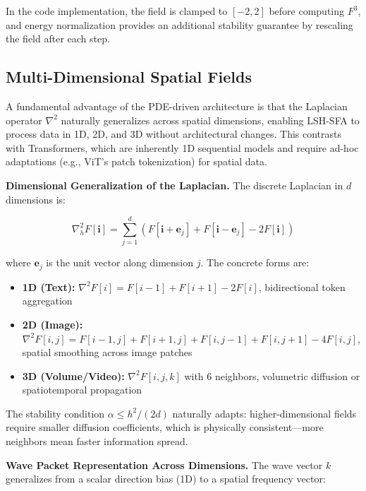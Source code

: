 \documentclass{article}
\begin{document}
In the code implementation, the field is clamped to $[-2, 2]$ before computing $F^3$, and energy normalization provides an additional stability guarantee by rescaling the field after each step.

\subsection{Multi-Dimensional Spatial Fields}

A fundamental advantage of the PDE-driven architecture is that the Laplacian operator $\nabla^2$ naturally generalizes across spatial dimensions, enabling LSH-SFA to process data in 1D, 2D, and 3D without architectural changes. This contrasts with Transformers, which are inherently 1D sequential models and require ad-hoc adaptations (e.g., ViT's patch tokenization) for spatial data.

\textbf{Dimensional Generalization of the Laplacian.} The discrete Laplacian in $d$ dimensions is:

\begin{equation}
\nabla^2_h F[\mathbf{i}] = \sum_{j=1}^{d} \left(F[\mathbf{i} + \mathbf{e}_j] + F[\mathbf{i} - \mathbf{e}_j] - 2F[\mathbf{i}]\right)
\end{equation}

where $\mathbf{e}_j$ is the unit vector along dimension $j$. The concrete forms are:

\begin{itemize}
\item \textbf{1D (Text):} $\nabla^2 F[i] = F[i-1] + F[i+1] - 2F[i]$, bidirectional token aggregation
\item \textbf{2D (Image):} $\nabla^2 F[i,j] = F[i\!-\!1,j] + F[i\!+\!1,j] + F[i,j\!-\!1] + F[i,j\!+\!1] - 4F[i,j]$, spatial smoothing across image patches
\item \textbf{3D (Volume/Video):} $\nabla^2 F[i,j,k]$ with 6 neighbors, volumetric diffusion or spatiotemporal propagation
\end{itemize}

The stability condition $\alpha \leq h^2/(2d)$ naturally adapts: higher-dimensional fields require smaller diffusion coefficients, which is physically consistent---more neighbors mean faster information spread.

\textbf{Wave Packet Representation Across Dimensions.} The wave vector $k$ generalizes from a scalar direction bias (1D) to a spatial frequency vector:
\end{document}
